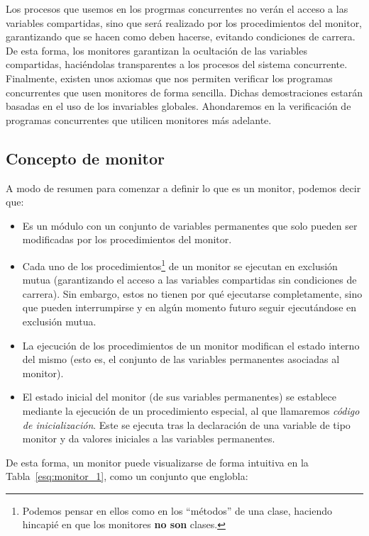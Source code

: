 Los procesos que usemos en los progrmas concurrentes no verán el acceso a las variables compartidas, sino que será realizado por los procedimientos del monitor, garantizando que se hacen como deben hacerse, evitando condiciones de carrera. De esta forma, los monitores garantizan la ocultación de las variables compartidas, haciéndolas transparentes a los procesos del sistema concurrente.\\

Finalmente, existen unos axiomas que nos permiten verificar los programas concurrentes que usen monitores de forma sencilla. Dichas demostraciones estarán basadas en el uso de los invariables globales. Ahondaremos en la verificación de programas concurrentes que utilicen monitores más adelante.

\subsection{Concepto de monitor}\label{sec:concepto_de_monitor}
A modo de resumen para comenzar a definir lo que es un monitor, podemos decir que:
\begin{itemize}
    \item Es un módulo con un conjunto de variables permanentes que solo pueden ser modificadas por los procedimientos del monitor.
    \item Cada uno de los procedimientos\footnote{Podemos pensar en ellos como en los ``métodos'' de una clase, haciendo hincapié en que los monitores \textbf{no son} clases.} de un monitor se ejecutan en exclusión mutua (garantizando el acceso a las variables compartidas sin condiciones de carrera). Sin embargo, estos no tienen por qué ejecutarse completamente, sino que pueden interrumpirse y en algún momento futuro seguir ejecutándose en exclusión mutua.
    \item La ejecución de los procedimientos de un monitor modifican el estado interno del mismo (esto es, el conjunto de las variables permanentes asociadas al monitor).
    \item El estado inicial del monitor (de sus variables permanentes) se establece mediante la ejecución de un procedimiento especial, al que llamaremos \textit{código de inicialización}. Este se ejecuta tras la declaración de una variable de tipo monitor y da valores iniciales a las variables permanentes.
\end{itemize}
De esta forma, un monitor puede visualizarse de forma intuitiva en la Tabla~\ref{esq:monitor_1}, como un conjunto que englobla:
